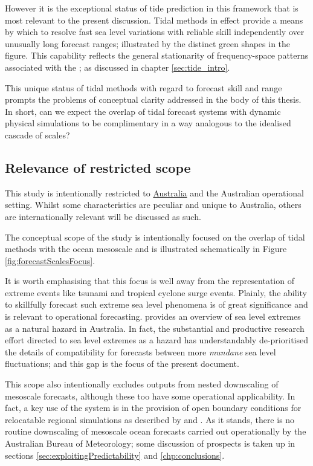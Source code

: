 However it is the exceptional status of tide prediction in this framework that is most relevant to the present discussion.  Tidal methods in effect provide a means by which to resolve fast sea level variations with reliable skill independently over unusually long forecast ranges; illustrated by the distinct green shapes in the figure.    This capability reflects the general stationarity of frequency-space patterns associated with the \ATGP{}; as discussed in chapter \ref{sec:tide_intro}.

This unique status of tidal methods with regard to forecast skill and range prompts the problems of conceptual clarity addressed in the body of this thesis.  In short, can we expect the overlap of tidal forecast systems with dynamic physical simulations to be complimentary in a way analogous to the idealised cascade of scales?
\subsection{Relevance of restricted scope}
This study is intentionally restricted to \underline{Australia} and the Australian operational setting.  Whilst some characteristics are peculiar and unique to Australia, others are internationally relevant will be discussed as such.


The conceptual scope of the study is intentionally focused on the overlap of tidal methods with the ocean mesoscale and is illustrated schematically in Figure \ref{fig:forecastScalesFocus}.


It is worth emphasising that this focus is well away from the representation of extreme events like tsunami and tropical cyclone surge events.   Plainly, the ability to skillfully forecast such extreme sea level phenomena is of great significance and is relevant to operational forecasting. \citet{McInnes:2016km} provides an overview of sea level extremes as a natural hazard in Australia.    
In fact, the substantial and productive research effort directed to sea level extremes as a hazard has understandably de-prioritised the details of compatibility for forecasts between more \emph{mundane} sea level fluctuations; and this gap is the focus of the present document. 

This scope also intentionally excludes outputs from nested downscaling of mesoscale forecasts, although these too have some operational applicability.   In fact, a key use of the  \BL{} system is in the provision of open boundary conditions for relocatable regional simulations as described by \cite{10.1080/1755876x.2019.1685834} and \cite{10.1007/978-3-319-15994-2_23}.  As it stands, there is no routine downscaling of mesoscale ocean forecasts carried out operationally by the Australian Bureau of Meteorology; some discussion of prospects is taken up in sections \ref{sec:exploitingPredictability} and  \ref{chp:conclusions}. 

